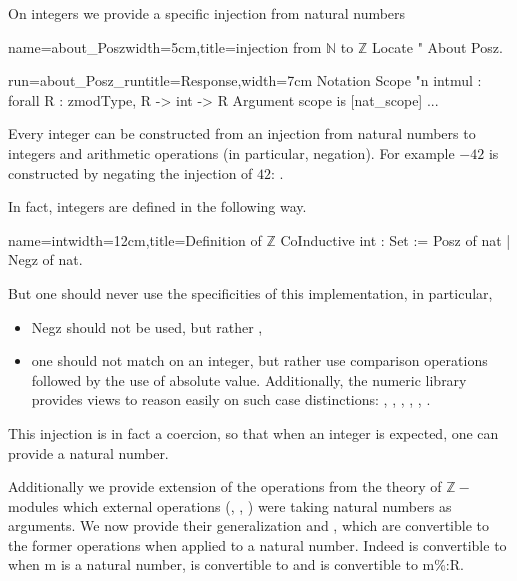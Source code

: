 On integers we provide a specific injection from natural numbers

\begin{coq}{name=about_Posz}{width=5cm,title=injection from $\mathbb{N}$
  to $\mathbb{Z}$}
Locate "%
About Posz.
\end{coq}
\begin{coqout}{run=about_Posz_run}{title=Response,width=7cm}
Notation            Scope
"n %
intmul : forall R : zmodType, R -> int -> R
Argument scope is [nat_scope] ...
\end{coqout}

Every integer can be constructed from an injection from natural
numbers to integers and arithmetic operations (in particular,
negation).  For example $-42$ is constructed by negating the injection
of $42$: .

In fact, integers are defined in the following way.

\begin{coq}{name=int}{width=12cm,title=Definition of $\mathbb{Z}$}
CoInductive int : Set := Posz of nat | Negz of nat.
\end{coq}

But one should never use the specificities of this implementation, in
particular,
\begin{itemize}
\item Negz should not be used, but rather ,
\item one should not match on an integer, but rather use comparison
  operations \C{_ <= _} followed by the use of absolute
  value. Additionally, the numeric library provides views to reason
  easily on such case distinctions: , , ,
  , , .
\end{itemize}


This injection is in fact a coercion, so that when an integer is
expected, one can provide a natural number.

Additionally we provide extension of the operations from the theory of
$\mathbb{Z}-$modules which external operations (\C{*+}, \C{*-},
) were taking natural numbers as arguments. We now provide
their generalization \C{*~} and , which are convertible to the
former operations when applied to a natural number.
Indeed  is convertible to  when m is a natural
number,  is convertible to  and
 is convertible to {m\%:R}.

